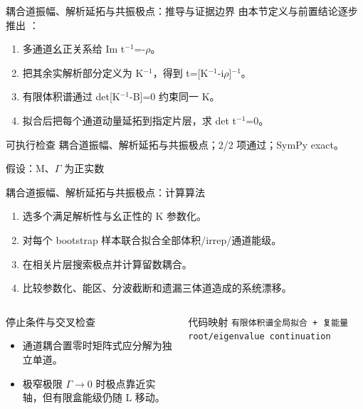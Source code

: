 \begin{frame}[t]{耦合道振幅、解析延拓与共振极点：推导与证据边界}
\footnotesize
{}\quad 由本节定义与前置结论逐步推出 ：
\begin{enumerate}
\item 多通道幺正关系给 Im t\ensuremath{^{-1}}=-\ensuremath{\rho}。
\item 把其余实解析部分定义为 K\ensuremath{^{-1}}，得到 t=[K\ensuremath{^{-1}}-i\ensuremath{\rho}]\ensuremath{^{-1}}。
\item 有限体积谱通过 det[K\ensuremath{^{-1}}-B]=0 约束同一 K。
\item 拟合后把每个通道动量延拓到指定片层，求 det t\ensuremath{^{-1}}=0。
\end{enumerate}\begin{block}{可执行检查}
\quad 耦合道振幅、解析延拓与共振极点；2/2 项通过；SymPy exact。
\par\scriptsize 假设：M、\ensuremath{\Gamma} 为正实数
\end{block}
\end{frame}

\begin{frame}[t]{耦合道振幅、解析延拓与共振极点：计算算法}
\footnotesize
{}\begin{enumerate}
\item 选多个满足解析性与幺正性的 K 参数化。
\item 对每个 bootstrap 样本联合拟合全部体积/\allowbreak{}irrep/\allowbreak{}通道能级。
\item 在相关片层搜索极点并计算留数耦合。
\item 比较参数化、能区、分波截断和遗漏三体道造成的系统漂移。
\end{enumerate}\begin{columns}[T,onlytextwidth]
\begin{block}{停止条件与交叉检查}\scriptsize\begin{itemize}
\item[\CheckMark] 通道耦合置零时矩阵式应分解为独立单道。
\item[\CheckMark] 极窄极限 \ensuremath{\Gamma}\ensuremath{\rightarrow}0 时极点靠近实轴，但有限盒能级仍随 L 移动。
\end{itemize}\end{block}
\begin{block}{代码映射}
\scriptsize \texttt{有限体积谱全局拟合 + 复能量 root/\allowbreak{}eigenvalue continuation}
\end{block}\end{columns}\end{frame}

